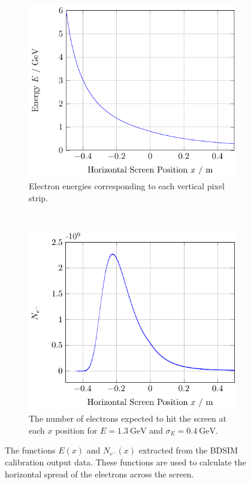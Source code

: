 \begin{figure}[!tb]
	\centering
	\begin{subfigure}[t]{\columnwidth}
		\includegraphics{./figures/eofx.pdf}
		\caption{
			Electron energies corresponding to each vertical pixel strip.
		}
		\label{fig:eofx}
	\end{subfigure}\hfill~
	\begin{subfigure}[t]{\columnwidth}
		\includegraphics{./figures/edist.pdf}
		\caption{
			The number of electrons expected to hit the screen at each \(x\)
			position for \(E=\SI{1.3}{\giga\electronvolt}\) and
			\(\sigma_E=\SI{0.4}{\giga\electronvolt}\).
		}
		\label{fig:edist}
	\end{subfigure}
	\caption{
		The functions \(E(x)\) and \(N_{e^-}(x)\) extracted from the BDSIM
		calibration output data. These functions are used to calculate the
		horizontal spread of the electrons across the screen.
	}
\end{figure}

